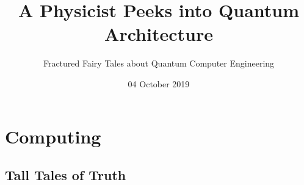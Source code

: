 \documentclass[handout]{beamer}
\title{A Physicist Peeks into Quantum Architecture}
\subtitle{Fractured Fairy Tales about Quantum Computer Engineering}
\date{04 October 2019}
\begin{document}
\maketitle

\begin{frame}
\tableofcontents
\end{frame}

%

\section{Computing}
\subsection{Tall Tales of Truth}
\end{document}
